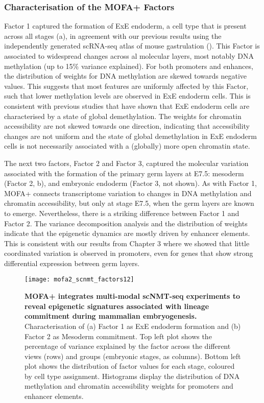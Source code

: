 \subsubsection{Characterisation of the MOFA+ Factors}

Factor 1 captured the formation of ExE endoderm, a cell type that is present across all stages (a), in agreement with our previous results using the independently generated scRNA-seq atlas of mouse gastrulation (). This Factor is associated to widespread changes across al molecular layers, most notably DNA methylation (up to 15\% variance explained). For both promoters and enhances, the distribution of weights for DNA methylation are skewed towards negative values. This suggests that most features are uniformly affected by this Factor, such that lower methylation levels are observed in ExE endoderm cells. This is consistent with previous studies that have shown that ExE endoderm cells are characterised by a state of global demethylation\cite{Zhang2017,Argelaguet2019}. The weights for chromatin accessibility are not skewed towards one direction, indicating that accessibility changes are not uniform and the state of global demethylation in ExE endoderm cells is not necessarily associated with a (globally) more open chromatin state.

The next two factors, Factor 2 and Factor 3, captured the molecular variation associated with the formation of the primary germ layers at E7.5: mesoderm (Factor 2, b), and embryonic endoderm (Factor 3, not shown). As with Factor 1, MOFA+ connects transcriptome variation to changes in DNA methylation and chromatin accessibility, but only at stage E7.5, when the germ layers are known to emerge. Nevertheless, there is a striking difference between Factor 1 and Factor 2. The variance decomposition analysis and the distribution of weights indicate that the epigenetic dynamics are mostly driven by enhancer elements. This is consistent with our results from Chapter 3 where we showed that little coordinated variation is observed in promoters, even for genes that show strong differential expression between germ layers.

\begin{figure}[H]
	\centering
	\texttt{[image: mofa2\_scnmt\_factors12]}
	\caption[]{
	\textbf{MOFA+ integrates multi-modal scNMT-seq experiments to reveal epigenetic signatures associated with lineage commitment during mammalian embryogenesis.} \\
	Characterisation of (a) Factor 1 as ExE endoderm formation and (b) Factor 2 as Mesoderm commitment. Top left plot shows the percentage of variance explained by the factor across the different views (rows) and groups (embryonic stages, as columns). Bottom left plot shows the distribution of factor values for each stage, coloured by cell type assignment. Histograms display the distribution of DNA methylation and chromatin accessibility weights for promoters and enhancer elements.
	}
	\label{fig:mofa2_scnmt_factors12}
\end{figure}

